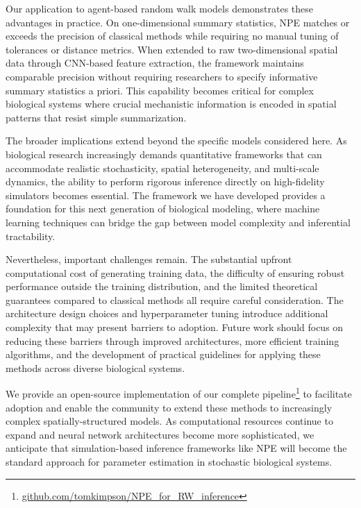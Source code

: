 \documentclass{article}
\begin{document}
Our application to agent-based random walk models demonstrates these advantages in practice. On one-dimensional summary statistics, NPE matches or exceeds the precision of classical methods while requiring no manual tuning of tolerances or distance metrics. When extended to raw two-dimensional spatial data through CNN-based feature extraction, the framework maintains comparable precision without requiring researchers to specify informative summary statistics a priori. This capability becomes critical for complex biological systems where crucial mechanistic information is encoded in spatial patterns that resist simple summarization.

The broader implications extend beyond the specific models considered here. As biological research increasingly demands quantitative frameworks that can accommodate realistic stochasticity, spatial heterogeneity, and multi-scale dynamics, the ability to perform rigorous inference directly on high-fidelity simulators becomes essential. The framework we have developed provides a foundation for this next generation of biological modeling, where machine learning techniques can bridge the gap between model complexity and inferential tractability.

Nevertheless, important challenges remain. The substantial upfront computational cost of generating training data, the difficulty of ensuring robust performance outside the training distribution, and the limited theoretical guarantees compared to classical methods all require careful consideration. The architecture design choices and hyperparameter tuning introduce additional complexity that may present barriers to adoption. Future work should focus on reducing these barriers through improved architectures, more efficient training algorithms, and the development of practical guidelines for applying these methods across diverse biological systems.

We provide an open-source implementation of our complete pipeline\footnote{\href{https://github.com/tomkimpson/NPE_for_RW_inference}{github.com/tomkimpson/NPE\_for\_RW\_inference}} to facilitate adoption and enable the community to extend these methods to increasingly complex spatially-structured models. As computational resources continue to expand and neural network architectures become more sophisticated, we anticipate that simulation-based inference frameworks like NPE will become the standard approach for parameter estimation in stochastic biological systems. 
\end{document}
